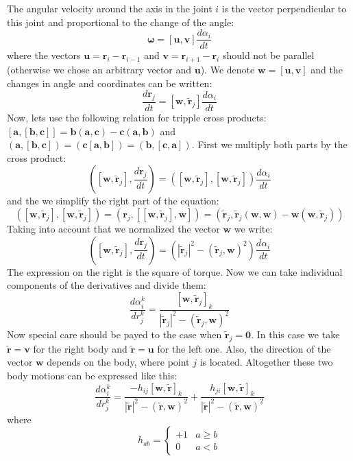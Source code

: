 The angular velocity around the axis in the joint $i$ is the vector perpendicular to this joint and proportional to the change of the angle:
$$
\mathbf{\omega} = [\mathbf{u}, \mathbf{v}] \frac{d\alpha_i}{dt}
$$
where the vectors $\mathbf{u} = \mathbf{r}_i - \mathbf{r}_{i-1}$ and $\mathbf{v} = \mathbf{r}_{i+1} - \mathbf{r}_{i}$ should 
not be parallel (otherwise we chose an arbitrary vector and $\mathbf{u}$). We denote $\mathbf{w} = [\mathbf{u}, \mathbf{v}]$ 
and the changes in angle and coordinates can be written:
$$
\frac{d\mathbf{r}_j}{dt} = [\mathbf{w}, \mathbf{\widetilde{r}}_j] \frac{d\alpha_i}{dt}
$$
Now, lets use the following relation for tripple cross products: 
$[\mathbf{a},[\mathbf{b},\mathbf{c}]] = \mathbf{b} (\mathbf{a}, \mathbf{c}) - \mathbf{c} (\mathbf{a}, \mathbf{b})$
and
$(\mathbf{a},[\mathbf{b},\mathbf{c}]) = (\mathbf{c} [\mathbf{a}, \mathbf{b}]) = (\mathbf{b}, [\mathbf{c}, \mathbf{a}])$.
First we multiply both parts by the cross product:
$$
([\mathbf{w}, \mathbf{\widetilde{r}}_j], \frac{d\mathbf{r}_j}{dt}) = ([\mathbf{w}, \mathbf{\widetilde{r}}_j],
[\mathbf{w}, \mathbf{\widetilde{r}}_j]) \frac{d\alpha_i}{dt}
$$
and the we simplify the right part of the equation:
$$
([\mathbf{w}, \mathbf{\widetilde{r}}_j], [\mathbf{w}, \mathbf{\widetilde{r}}_j]) = (\mathbf{r}_j, [[\mathbf{w}, \mathbf{\widetilde{r}}_j], \mathbf{w}]) =
(\mathbf{\widetilde{r}}_j, \mathbf{\widetilde{r}}_j(\mathbf{w},\mathbf{w}) - \mathbf{w}(\mathbf{w},\mathbf{\widetilde{r}}_j))
$$
Taking into account that we normalized the vector $\mathbf{w}$ we write:
$$
([\mathbf{w}, \mathbf{\widetilde{r}}_j], \frac{d\mathbf{r}_j}{dt}) = \left( |\mathbf{\widetilde{r}}_j|^2 - 
(\mathbf{\widetilde{r}}_j,\mathbf{w})^2 \right) \frac{d\alpha_i}{dt}
$$
The expression on the right is the square of torque. Now we can take individual components of the derivatives and divide them:
$$
\frac{d\alpha_i^k}{dr^k_j} = \frac{[\mathbf{w}, \mathbf{\widetilde{r}}_j]_k}{|\mathbf{\widetilde{r}}_j|^2 - (\mathbf{\widetilde{r}}_j,\mathbf{w})^2}
$$
Now special care should be payed to the case when $\mathbf{\widetilde{r}}_j = \mathbf{0}$. 
In this case we take $\mathbf{\widetilde{r}} = \mathbf{v}$ for the right body and 
$\mathbf{\widetilde{r}} = \mathbf{u}$ for the left one. Also, 
the direction of the vector $\mathbf{w}$ depends on the body, where point $j$ is located. 
Altogether these two body motions can be expressed like this:
$$
\frac{d\alpha_i^k}{dr^k_j} = \frac{ -h_{ij}[\mathbf{w},\mathbf{\widetilde{r}}]_k}{|\mathbf{\widetilde{r}}|^2 - (\mathbf{\widetilde{r}},\mathbf{w})^2} + 
\frac{ h_{ji}[\mathbf{w},\mathbf{\widetilde{r}}]_k}{|\mathbf{\widetilde{r}}|^2 - (\mathbf{\widetilde{r}},\mathbf{w})^2}
$$ where
$$
h_{ab} = \left \{ \begin{array}{lll}
+1  & a\geq b \\
0  & a<b
\end{array}
\right.
$$


